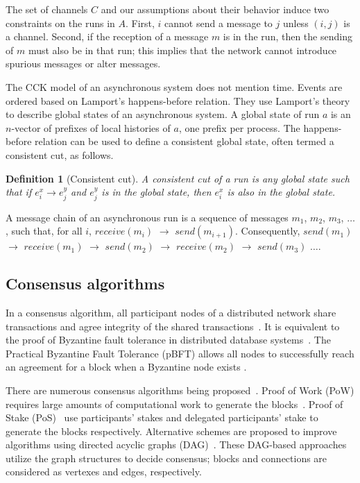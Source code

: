 \documentclass[preprint,12pt]{elsarticle}
\newtheorem{defn}{Definition}[section]
\begin{document}
The set of channels $C$ and our assumptions about their behavior induce two constraints on the runs in $A$. First, $i$ cannot send a message to $j$ unless $(i,j)$ is a channel. Second, if the reception of a message $m$ is in the run, then the sending of $m$ must also be in that run; this implies that the network cannot introduce spurious messages or alter messages.

The CCK model of an asynchronous system does not mention time. Events are ordered based on Lamport's happens-before relation. They use Lamport’s theory to describe global states of an asynchronous system. A global state of run $a$ is an $n$-vector of prefixes of local histories of $a$, one prefix per process.
The happens-before relation can be used to define a consistent global state, often termed a consistent cut, as follows. 

\begin{defn}[Consistent cut] A consistent cut of a run is any global state such that if $e^x_i \rightarrow e^y_j$ and $e^y_j$ is in the global state, then $e^x_i$ is also in the global state.
\end{defn} 

A message chain of an asynchronous run is a sequence of messages $m_1$, $m_2$, $m_3$, $\dots$, such that, for all $i$, $receive(m_i)$ $\rightarrow$  $send(m_{i+1})$. Consequently,
	$send(m_1)$ $\rightarrow$ $receive(m_1)$ $\rightarrow$ $send(m_2)$ $\rightarrow$ $receive(m_2)$ $\rightarrow$ $send(m_3)$ $\dots$.


\subsection{Consensus algorithms}


 In a consensus algorithm, all participant nodes of a distributed network share transactions and agree integrity of the shared transactions~\cite{Lamport82}. It is equivalent to the proof of Byzantine fault tolerance in distributed database systems~\cite{randomized03, paxos01}. 
The Practical Byzantine Fault Tolerance (pBFT) allows all nodes to successfully reach an agreement for a block when a Byzantine node exists \cite{Castro99}. 


There are numerous consensus algorithms being proposed~\cite{algorand16, algorand17}. Proof of Work (PoW) requires
large amounts of computational work to generate the blocks~\cite{bitcoin08}.  Proof of Stake (PoS)~\cite{ppcoin12,dpos14} use participants' stakes and delegated participants' stake to generate the blocks respectively. Alternative schemes are proposed to improve algorithms using directed acyclic graphs (DAG)~\cite{dagcoin15}. These DAG-based approaches utilize the graph structures to decide consensus; blocks and connections are considered as vertexes and edges, respectively. 
\end{document}
